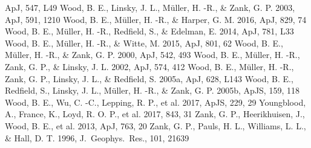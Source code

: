 \documentclass[preprint]{aastex}
\begin{document}
\begin{thebibliography}{}
  ApJ, 547, L49
Wood, B. E., Linsky, J. L., M{\"u}ller, H. -R., \& Zank, G. P. 2003,
  ApJ, 591, 1210
Wood, B. E., M\"{u}ller, H. -R., \& Harper, G. M. 2016, ApJ, 829, 74
Wood, B. E., M\"{u}ller, H. -R., Redfield, S., \& Edelman, E. 2014,
  ApJ, 781, L33
Wood, B. E., M{\"u}ller, H. -R., \& Witte, M. 2015, ApJ, 801, 62
Wood, B. E., M{\"u}ller, H. -R., \& Zank, G. P. 2000, ApJ, 542, 493
Wood, B. E., M{\"u}ller, H. -R., Zank, G. P., \& Linsky, J. L. 2002, ApJ, 574, 412
Wood, B. E., M\"{u}ller, H. -R., Zank, G. P., Linsky, J. L., \& Redfield, S.
  2005a, ApJ, 628, L143
Wood, B. E., Redfield, S., Linsky, J. L., M\"{u}ller, H. -R., \&
  Zank, G. P. 2005b, ApJS, 159, 118
Wood, B. E., Wu, C. -C., Lepping, R. P., et al. 2017, ApJS, 229, 29
Youngblood, A., France, K., Loyd, R. O. P., et al. 2017, 843, 31
Zank, G. P., Heerikhuisen, J., Wood, B. E., et al. 2013, ApJ, 763, 20
Zank, G. P., Pauls, H. L., Williams, L. L., \& Hall, D. T. 1996,
  J.~Geophys.~Res., 101, 21639
\end{thebibliography}
\end{document}
